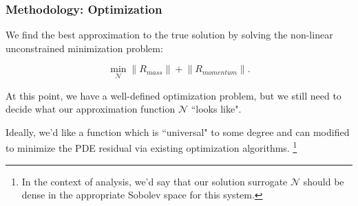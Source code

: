 \begin{frame}
    \frametitle{Methodology: Optimization}

    We find the best approximation to the true solution by solving the non-linear unconstrained minimization problem:

    $$
    \min_{\mathcal{N}} {\lVert R_{mass} \rVert + \lVert R_{momentum} \rVert}.
    $$

    \bigskip
    \pause

    At this point, we have a well-defined optimization problem, but we still need to decide what our approximation 
    function $\mathcal{N}$ ``looks like". 

    \bigskip
    \pause

    Ideally, we'd like a function which is ``universal" to some degree and can modified to minimize the PDE residual via 
    existing optimization algorithms. \footnote{
        In the context of analysis, we'd say that our solution surrogate $\mathcal{N}$ should be dense in the 
        appropriate Sobolev space for this system.
    }
\end{frame}